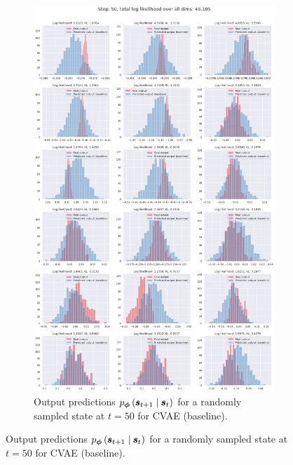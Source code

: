 \begin{figure}
\begin{subfigure}{\textwidth}
    \includegraphics[trim=0 1370 0 0,clip,width=1.0\textwidth]
    {img/windyslope/output/windyslope_output_baseline_dist_10_step50.png}
    \caption{Output predictions $p_{\vph}\protect\given*{\vns}{\vs}$ for a randomly sampled state at $t=50$ for CVAE (baseline).}
    \label{fig:output_distribution_step50_posvel_baseline}
\end{subfigure}

\end{figure}


